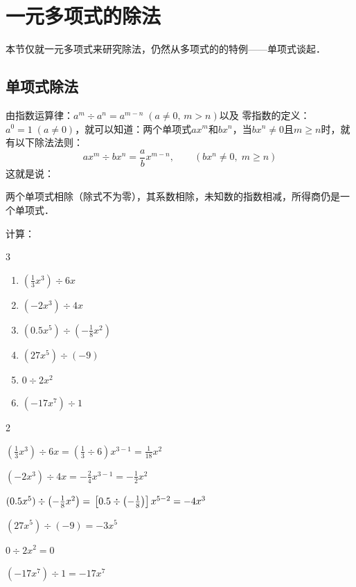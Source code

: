 \section{一元多项式的除法}
本节仅就一元多项式来研究除法，仍然从多项式的的特例——单项式谈起．
\subsection{单项式除法}
由指数运算律：$a^m\div a^n=a^{m-n}\; (a\ne 0,\, m>n)$以及
零指数的定义：$a^0=1\; (a\ne 0)$，就可以知道：两个单项式$ax^m$和$bx^n$，当$bx^n\ne 0$且$m\ge n$时，就有以下除法法则：
\[ax^m\div bx^n =\frac{a}{b}x^{m-n},\qquad (bx^n\ne 0,\; m\ge n) \]
这就是说：

\begin{blk}{}
    两个单项式相除（除式不为零），其系数相除，未知数的指数相减，所得商仍是一个单项式．
\end{blk}

\begin{example}
计算：
\begin{multicols}{3}
    \begin{enumerate}
        \item $\left(\frac{1}{3}x^3\right)\div 6x$
        \item $(-2x^3)\div 4x$
        \item $(0.5x^5)\div \left(-\frac{1}{8}x^2\right)$
        \item $(27x^5)\div (-9)$
        \item $0\div 2x^2$
        \item $(-17x^7)\div 1$
    \end{enumerate}
\end{multicols}
\end{example}

\begin{solution}
    \begin{enumerate}
        \begin{multicols}{2}
             \item $\left(\frac{1}{3}x^3\right)\div 6x=\left(\frac{1}{3}\div 6\right)x^{3-1}=\frac{1}{18}x^2$
        \item $(-2x^3)\div 4x=-\frac{2}{4}x^{3-1}=-\frac{1}{2}x^2$
        \item $(0.5x^5)\div \left(-\frac{1}{8}x^2\right)=\\\left[0.5\div \left(-\frac{1}{8}\right)\right]x^{5-2}=-4x^3$
        \item $(27x^5)\div (-9)=-3x^5$
        \item $0\div 2x^2=0$
        \item $(-17x^7)\div 1=-17x^7$
        \end{multicols}
    \end{enumerate}
\end{solution}

